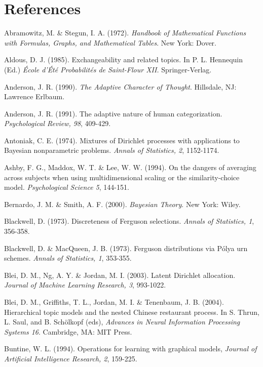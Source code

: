 \documentclass[authoryear]{elsarticle}
\begin{document}
\section*{References}
\begin{list}{}{\setlength{\leftmargin}{12pt}\setlength{\itemindent}{-12pt}\setlength{\parsep}{0pt}}
\item Abramowitz, M. \& Stegun, I. A. (1972). {\it Handbook of Mathematical Functions with Formulas, Graphs, and Mathematical Tables}. New York: Dover.
\item Aldous, D. J. (1985). Exchangeability and related topics. In P. L. Hennequin (Ed.) {\it \'{E}cole d'\'{E}t\'{e} Probabilit\'{e}s de Saint-Flour XII.} Springer-Verlag.
\item Anderson, J. R. (1990). {\it The Adaptive Character of Thought}. Hillsdale, NJ: Lawrence Erlbaum.
\item Anderson, J. R. (1991). The adaptive nature of human categorization. {\it Psychological Review, 98}, 409-429.
\item Antoniak, C. E. (1974). Mixtures of Dirichlet processes with applications to Bayesian nonparametric problems. {\it Annals of Statistics, 2}, 1152-1174.
\item Ashby, F. G., Maddox, W. T. \& Lee, W. W. (1994). On the dangers of averaging across subjects when using multidimensional scaling or the similarity-choice model. {\it Psychological Science 5}, 144-151.
\item Bernardo, J. M. \& Smith, A. F. (2000). {\it Bayesian Theory}. New York: Wiley.
\item Blackwell, D. (1973). Discreteness of Ferguson selections. {\it Annals of Statistics, 1}, 356-358.
\item Blackwell, D. \& MacQueen, J. B. (1973). Ferguson distributions via P\'{o}lya urn schemes. {\it Annals of Statistics, 1}, 353-355.
\item Blei, D. M., Ng, A. Y. \& Jordan, M. I. (2003). Latent Dirichlet allocation. {\it Journal of Machine Learning Research, 3}, 993-1022.
\item Blei, D. M., Griffiths, T. L., Jordan, M. I. \& Tenenbaum, J. B. (2004). Hierarchical topic models and the nested Chinese restaurant process.  In S. Thrun, L. Saul, and B. Sch\"{o}lkopf (eds), {\it Advances in Neural Information Processing Systems 16}. Cambridge, MA: MIT Press.
\item Buntine, W. L. (1994). Operations for learning with graphical models, {\it Journal of Artificial Intelligence Research, 2}, 159-225.

\end{list}
\end{document}
